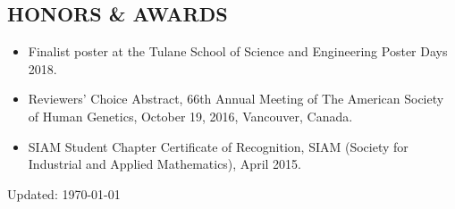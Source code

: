 \documentclass[overlapped, line, 10pt]{res} %
\begin{document}
\begin{resume}

\section{HONORS \& AWARDS}

\begin{itemize}
  \item Finalist poster at the Tulane School of Science and Engineering Poster Days 2018.
  \item Reviewers’ Choice Abstract, 66th Annual Meeting of The American Society of Human Genetics, October 19, 2016, Vancouver, Canada.
  \item SIAM Student Chapter Certificate of Recognition, SIAM (Society for Industrial and Applied Mathematics), April 2015.
\end{itemize}

\vfill
\centerline{Updated: \today}


\end{resume}
\end{document}
